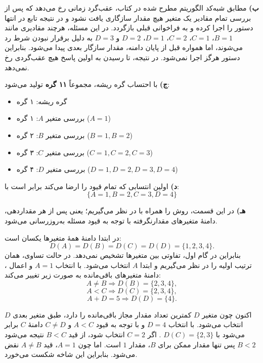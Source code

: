 \documentclass[10.5pt]{exam}
\begin{document}
\vspace{0.5cm}

\textbf{ب)}
مطابق شبه‌کد الگوریتم  مطرح شده در کتاب، عقب‌گرد زمانی رخ می‌دهد که پس از بررسی تمام مقادیر یک متغیر 
هیچ مقدار سازگاری یافت نشود و در نتیجه تابع در انتها دستور
را اجرا کرده و به فراخوانی قبلی بازگردد.
در این مسئله، هرچند مقادیری مانند $B=1$، $C=1$، $C=2$، $D=1$، $D=2$ و $D=3$ به دلیل برقرار نبودن شرط
رد می‌شوند، اما همواره قبل از پایان دامنه، مقدار سازگار بعدی پیدا می‌شود. بنابراین دستور
هرگز اجرا نمی‌شود. در نتیجه، تا رسیدن به اولین پاسخ هیچ عقب‌گردی رخ نمی‌دهد.


\vspace{0.5cm}


\textbf{ج)}
با احتساب گره ریشه، مجموعاً \textbf{۱۱ گره} تولید می‌شود:
\begin{itemize}
    \item گره ریشه: ۱ گره
    \item بررسی متغیر $A$: ۱ گره ($A=1$)
    \item بررسی متغیر $B$: ۲ گره ($B=1, B=2$)
    \item بررسی متغیر $C$: ۳ گره ($C=1, C=2, C=3$)
    \item بررسی متغیر $D$: ۴ گره ($D=1, D=2, D=3, D=4$)
\end{itemize}

\vspace{0.5cm}
\textbf{د)}
اولین انتسابی که تمام قیود را ارضا می‌کند برابر است با:
$$ \{A = 1, B = 2, C = 3, D = 4\} $$

\textbf{هـ)}
در این قسمت، روش  را همراه با  در نظر می‌گیریم؛ یعنی پس از هر مقداردهی، دامنهٔ متغیرهای مقدارنگرفته با توجه به قیود مسئله به‌روزرسانی می‌شود.

در ابتدا دامنهٔ همهٔ متغیرها یکسان است:
\[
D(A)=D(B)=D(C)=D(D)=\{1,2,3,4\}.
\]
بنابراین در گام اول،  تفاوتی بین متغیرها تشخیص نمی‌دهد. در حالت تساوی، همان ترتیب اولیه را در نظر می‌گیریم و ابتدا \(A\) انتخاب می‌شود. با انتخاب
\(A=1\)
و اعمال ، دامنهٔ متغیرهای باقی‌مانده به صورت زیر تغییر می‌کند:
\[
A\neq B \Rightarrow D(B)=\{2,3,4\},
\]
\[
A<C \Rightarrow D(C)=\{2,3,4\},
\]
\[
A+D=5 \Rightarrow D(D)=\{4\}.
\]

اکنون چون متغیر \(D\) کمترین تعداد مقدار مجاز باقی‌مانده را دارد، طبق  متغیر بعدی \(D\) انتخاب می‌شود. با انتخاب
\(D=4\)
و با توجه به قیود
\(
A<C\) و
\(
C\neq D
\)
دامنهٔ \(C\) برابر می‌شود با
\(
D(C)=\{2,3\}
\)
.
اگر \(C=2\) انتخاب شود، از قید \(B<C\) نتیجه می‌شود
\(
B<2
\)
پس تنها مقدار ممکن برای \(B\)، مقدار \(1\) است. اما چون \(A=1\)، قید \(A\neq B\) نقض می‌شود. بنابراین این شاخه شکست می‌خورد.
\end{document}
